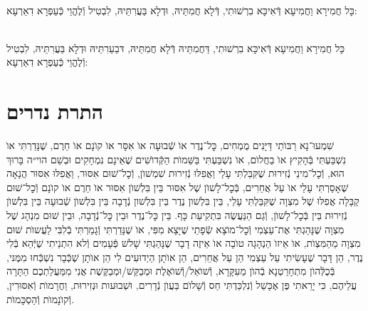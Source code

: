 \documentclass[twoside, openany, parskip=half, 11pt]{book}
\begin{document}
\\
כָּל חֲמִירָא וַחֲמִיעָא דְּֿאִיכָּא בִרְשׁוּתִי, דְּֿלָא חֲמִתֵּיהּ, וּדְלָא בַּעֲרִתֵּיהּ, לִבְטִיל וְֿלֶהֱוֵי כְּֿעַפְרָא דִאַרְעָא:


\\
כָּל חֲמִירָא וַחֲמִיעָא דְּֿאִיכָּא בִרְשׁוּתִי, דַּחֲמִתֵּיהּ דְּֿלָא חֲמִתֵּיהּ, דּבַעַרִתֵּיהּ וּדְלָא בַּעֲרִתֵּיהּ, לִבְטִיל וְֿלֶהֱוֵי כְּֿעַפְרָא דִאַרְעָא:



\chapter[התרת נדרים]{ התרת נדרים }


שִׁמְעוּ־נָא רַבּוׂתַי דַּיָּנִים מֻמְחִים, כׇּל־נֶדֶר אוׂ שְֿׁבוּעָה אוׂ אִסָּר אוׂ קוׂנָם אוׂ חֵרֶם, שֶׁנָּדַרְתִּי אוׂ נִשְׁבַּעְתִּי בְּֿהָקִיץ אוׂ בַחֲלוׂם, אוׂ נִשְׁבַּעְתִּי בַּשֵּׁמוׂת הַקְּֿדוׂשִׁים שֶׁאֵינָם נִמְחָקִים וּבְשֵׁם הוי״ה בָּרוּךְ הוּא, וְֿכׇל־מִינֵי נְֿזִירוּת שֶׁקִּבַּלְתִּי עָלַי וַאֲפִלּוּ נְֿזִירוּת שִׁמְשׁוׂן, וְֿכׇל־שׁוּם אִסּוּר, וַאֲפִלּוּ אִסּוּר הֲנָאָה שֶׁאָסַרְתִּי עָלַי אוׂ עַל אֲחֵרִים, בְּֿכׇל־לָשׁוׂן שֶׁל אִסּוּר בֵּין בִּלְשׁוׂן אִסּוּר אוׂ חֵרֶם אוׂ קוׂנָם וְֿכׇל־שׁוּם קַבָּלָה אֲפִלּוּ שֶׁל מִצְוָה שֶׁקִּבַּלְתִּי עָלַי, בֵּין בִּלְשׁון נֶדֶר בֵּין בִּלְשׁון נְֿדָבָה בֵּין בִּלְשׁוׂן שְֿׁבוּעָה בֵּין בִּלְשׁוׂן נְֿזִירוּת בֵּין בְּֿכׇל־לָשׁוׂן, וְֿגַם הַנַּעֲשֶׂה בִּתְקִיעַת כָּף. בֵּין כׇּל־נֶדֶר וּבֵין כׇּל־נְֿדָבָה, וּבֵין שׁוּם מִנְהָג שֶׁל מִצְוָה שֶׁנָּהַגְתִּי אֶת־עַצְמִי וְֿכׇל־מוׂצָא שְֿׂפָתַי שֶׁיָּצָא מִפִּי, אוׂ שֶׁנָּדַרְתִּי וְֿגָמַרְתִּי בְֿלִבִּי לַעֲשוׂת שׁוּם מִצְוָה מֵהַמִּצְוׂת, אוׂ אֵיזוׂ הַנְהָגָה טוׂבָה אוׂ אֵיזֶה דָבָר שֶׁנָּהַגְתִּי שָׁלשׁ פְּֿעָמִים וְֿלא הִתְנֵיתִי שֶׁיְּֿהֵא בְּֿלִי נֶדֶר, הֵן דָּבָר שֶׁעָשִׂיתִי עַל עַצְמִי הֵן עַל אֲחֵרִים, הֵן אוׂתָן הַיְדוּעִים לִי הֵן אוׂתָן שֶׁכְּֿבָר נִשְׁכְּֿחוּ מִמֶּנּי, בְּֿכֻלְּֿהוׂן מִתְחָרַטְנָא בְֿהוׂן מֵעִקָּרָא, וְֿשׁוׂאֵל/וְֿשׁוׂאֶלֶת וּמְבַקֵּשׁ/וּמְבַקֶּשֶׁת אֲנִי מִמַּעֲלַתְכֶם הַתָּרָה עֲלֵיהֶם, כִּי יָרֵאתִי פֶּן אֶכָּשֵׁל וְֿנִלְכַּדְתִּי חַס וְֿשָׁלוׂם בַּעֲוׂן נְֿדָרִים, וּשְׁבוּעות וּנְזִירוּת, וַחֲרָמוׂת וְֿאִסּוּרִין, וְֿקוׂנָמוׂת וְֿהַסְכָּמוׂת.
\end{document}
